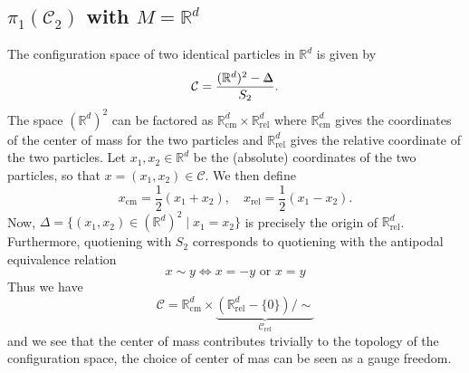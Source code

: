 \documentclass[a4paper,10pt,oneside]{book}
\theoremstyle{plain}
\theoremstyle{definition}
\theoremstyle{remark}
\newcommand{\R}{\mathbb{R}}
\def\bbDelta{{%
\setbox0\hbox{$\Delta$}%
\rlap{\hbox to \wd0{\hss\scalebox{0.82}{$\Delta$}}}\box0
}}
\begin{document}



\subsection{\texorpdfstring{$\pi_1(\mathcal{C}_2)$ with $M = \mathbb{R}^d$}{π₁(C₂) with M = Rᵈ}}\label{sec:conf sp 2 particles}

The configuration space of two identical particles in $\mathbb{R}^d$ is given by
\begin{equation}
  \mathcal{C} = \frac{(\R^d)^2 - \bbDelta}{S_2}.
\end{equation}
The space $(\R^d)^2$ can be factored as $\R^d_\text{cm} \times \R^d_\text{rel}$ where $\R^d_\text{cm}$ gives the coordinates of the center of mass for the two particles and $\R^d_\text{rel}$ gives the relative coordinate of the two particles. Let $x_1, x_2 \in \R^d$ be the (absolute) coordinates of the two particles, so that $x = (x_1, x_2) \in \mathcal{C}$. We then define
\begin{equation}
  x_\text{cm} = \frac{1}{2}(x_1 + x_2), \quad
  x_\text{rel} = \frac{1}{2}(x_1 - x_2).
\end{equation}
Now, $\Delta = \{(x_1, x_2) \in (\R^d)^2 \mid x_1 = x_2\}$ is precisely the origin of $\R^d_\text{rel}$.
Furthermore, quotiening with $S_2$ corresponds to quotiening with the antipodal equivalence relation
\begin{equation}
  x \sim y \iff x = -y \text{ or } x = y
\end{equation}
Thus we have
\begin{equation}
  \mathcal{C} = \R^d_\text{cm} \times \underbrace{(\R^d_\text{rel} - \{0\}) / {\sim}}_{\mathcal{C}_\text{rel}}
\end{equation}
and we see that the center of mass contributes trivially to the topology of the configuration space, the choice of center of mas can be seen as a gauge freedom.
\end{document}
